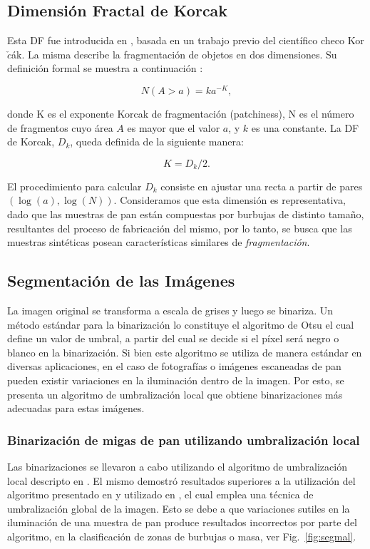 \subsection{Dimensi\'on Fractal de Korcak}
Esta DF fue introducida en \cite{Mandelbrot1983}, basada en un trabajo previo del cient\'ifico checo Kor$\check{c}$\'ak.
La misma describe la fragmentaci\'on de objetos en dos dimensiones.
Su definici\'on formal se muestra a continuación \cite{Imre11}:

$$N(A > a) = k a^{-K},$$

\noindent donde K es el exponente Korcak de fragmentaci\'on (patchiness), N es el n\'umero de fragmentos cuyo \'area $A$ es mayor que el valor $a$, y $k$ es una constante. La DF de Korcak, $D_{k}$, queda definida de la siguiente manera:

$$K = D_{k}/2.$$

El procedimiento para calcular $D_{k}$ consiste en ajustar una recta a partir de pares $(\log(a),\log(N))$.
Consideramos que esta dimensión es representativa, dado que las muestras de pan est\'an compuestas por burbujas de distinto tama\~no, resultantes del proceso de fabricación del mismo, por lo tanto, se busca que las muestras sint\'eticas posean caracter\'isticas similares de {\em fragmentaci\'on}.

\subsection{Segmentaci\'on de las Im\'agenes}
La imagen original se transforma a escala de grises y luego se binariza.
Un método estándar para la binarización lo constituye el algoritmo de Otsu \cite{Otsu79} el cual define un valor de umbral, a partir del cual se decide si el p\'ixel ser\'a negro o blanco en la binarizaci\'on. 
Si bien este algoritmo se utiliza de manera estándar en diversas aplicaciones, en el caso de fotografías o imágenes escaneadas de pan pueden existir variaciones en la iluminación dentro de la imagen.
Por esto, se presenta un algoritmo de umbralización local que obtiene binarizaciones más adecuadas para estas imágenes. 


\subsubsection{Binarización de migas de pan utilizando umbralización local}
Las binarizaciones se llevaron a cabo utilizando el algoritmo de umbralización local descripto en \cite{White83}.
El mismo demostró resultados superiores a la utilización del algoritmo presentado en \cite{Huang95} y utilizado en \cite{Gonzales2008}, el cual emplea una técnica de umbralización global de la imagen.
Esto se debe a que variaciones sutiles en la iluminación de una muestra de pan produce resultados incorrectos por parte del algoritmo, en la clasificación de zonas de burbujas o masa, ver Fig.~\ref{fig:segmal}.

